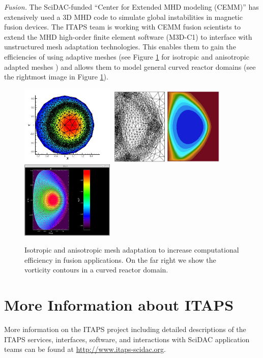 \documentclass[letterpaper]{jpconf}
\begin{document}
{\it Fusion.} The SciDAC-funded ``Center for Extended MHD modeling
(CEMM)'' has extensively used a 3D MHD code to simulate global
instabilities in magnetic fusion devices.  The ITAPS team is working
with CEMM fusion scientists to extend the MHD high-order finite
element software (M3D-C1) to interface with unstructured mesh
adaptation technologies. This enables them to gain the efficiencies of
using adaptive meshes (see Figure \ref{fig:fusion_mesh} for isotropic
and anisotropic adapted meshes \cite{Jard07,jard08}) and allows them
to model general curved reactor domains (see the rightmost image in
Figure \ref{fig:fusion_mesh}). 
\begin{figure}[htbp]
\centering
\includegraphics[width=1.75in]{Figures/adapted.jpg}
\includegraphics[width=2.25in]{Figures/anisotropic.jpg}
\includegraphics[width=1.75in]{Figures/PPPL-CURVED.jpg}
\caption{\label{fig:fusion_mesh} Isotropic and anisotropic mesh adaptation to
increase computational efficiency in fusion applications.
On the far right we show the vorticity contours in a 
curved reactor domain.}
\end{figure}

\section*{More Information about ITAPS}
More information on the ITAPS project including detailed descriptions
of the ITAPS services, interfaces, software, and interactions with SciDAC
application teams can be found at \url{http://www.itaps-scidac.org}.
\end{document}
